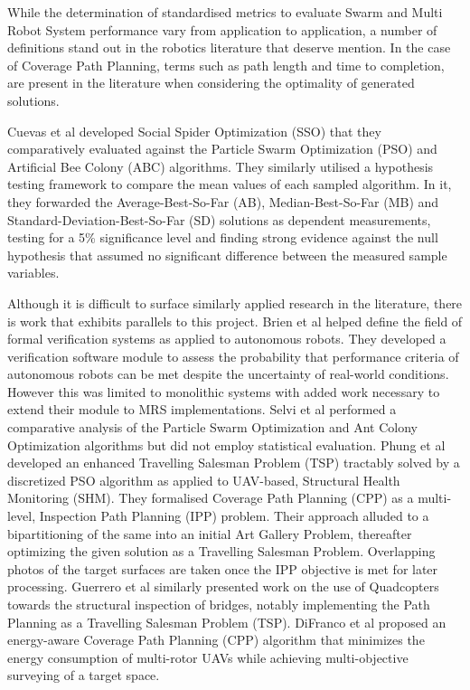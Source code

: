 \documentclass{report}
\begin{document}
While the determination of standardised metrics to evaluate Swarm and Multi Robot System performance vary from application to application, a number of definitions stand out in the robotics literature that deserve mention. In the case of Coverage Path Planning, terms such as path length and time to completion, are present in the literature \cite{Galceran2013} when considering the optimality of generated solutions.

Cuevas et al \cite{Cuevas2013} developed Social Spider Optimization (SSO) that they comparatively evaluated against the Particle Swarm Optimization (PSO) and Artificial Bee Colony (ABC) algorithms. They similarly utilised a hypothesis testing framework to compare the mean values of each sampled algorithm. In it, they forwarded the Average-Best-So-Far (AB), Median-Best-So-Far (MB) and Standard-Deviation-Best-So-Far (SD) solutions as dependent measurements, testing for a 5\% significance level and finding strong evidence against the null hypothesis that assumed no significant difference between the measured sample variables.

Although it is difficult to surface similarly applied research in the literature, there is work that exhibits parallels to this project. Brien et al \cite{Brien2014} helped define the field of formal verification systems as applied to autonomous robots. They developed a verification software module to assess the probability that performance criteria of autonomous robots can be met despite the uncertainty of real-world conditions. However this was limited to monolithic systems with added work necessary to extend their module to MRS implementations. Selvi et al \cite{Selvi2010} performed a comparative analysis of the Particle Swarm Optimization and Ant Colony Optimization algorithms but did not employ statistical evaluation. Phung et al \cite{Phung2017} developed an enhanced Travelling Salesman Problem (TSP) tractably solved by a discretized PSO algorithm as applied to UAV-based, Structural Health Monitoring (SHM). They formalised Coverage Path Planning (CPP) as a multi-level, Inspection Path Planning (IPP) problem. Their approach alluded to a bipartitioning of the same into an initial Art Gallery Problem, thereafter optimizing the given solution as a Travelling Salesman Problem. Overlapping photos of the target surfaces are taken once the IPP objective is met for later processing. Guerrero et al \cite{Guerrero2013} similarly presented work on the use of Quadcopters towards the structural inspection of bridges, notably implementing the Path Planning as a Travelling Salesman Problem (TSP). DiFranco et al \cite{DiFranco2015} proposed an energy-aware Coverage Path Planning (CPP) algorithm that minimizes the energy consumption of multi-rotor UAVs while achieving multi-objective surveying of a target space.
\end{document}
